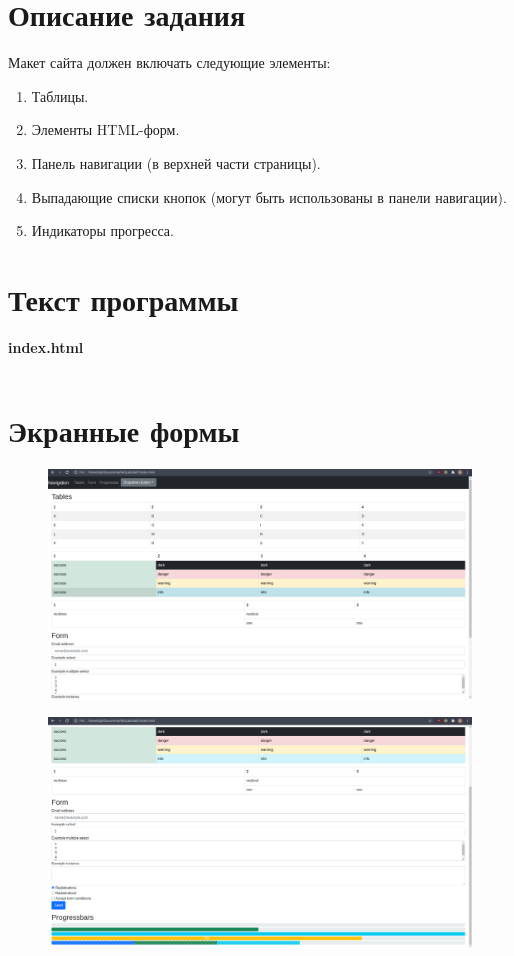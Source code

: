 \documentclass[20pt,a4paper]{report}
\begin{document}
	\chapter{Описание задания}
		\large
		\qquad Макет сайта должен включать следующие элементы: \\
		\begin{enumerate}
			\item Таблицы.
			\item Элементы HTML-форм.
			\item Панель навигации (в верхней части страницы).
			\item Выпадающие списки кнопок (могут быть использованы в панели навигации).
			\item Индикаторы прогресса.
		\end{enumerate}
	\chapter{Текст программы}
		\qquad \textbf{index.html} \\
		\small
		\inputminted[tabsize=4, linenos, breaklines]{html}{index.html}
		\large
		
	\chapter{Экранные формы}
		\begin{figure}[H]
			\includegraphics[width=\textwidth]{1.png}
		\end{figure}
		\begin{figure}[H]
			\includegraphics[width=\textwidth]{2.png}
		\end{figure}
\end{document}

